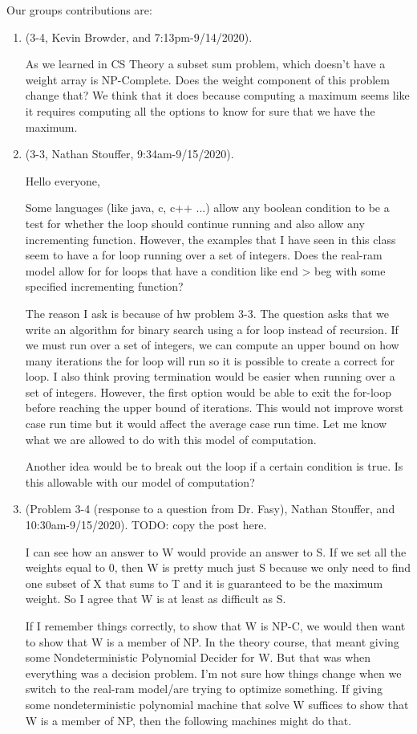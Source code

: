 \documentclass{article}
\begin{document}
Our groups contributions are:
\begin{enumerate}
    \item (3-4, Kevin Browder, and 7:13pm-9/14/2020).

    As we learned in CS Theory a subset sum problem, which doesn't have a weight array is NP-Complete. Does the weight component of this problem change that? We think that it does because computing a maximum seems like it requires computing all the options to know for sure that we have the maximum.
    \item (3-3, Nathan Stouffer, 9:34am-9/15/2020).

    Hello everyone,

    Some languages (like java, c, c++ ...) allow any boolean condition to be a test for whether the loop should continue running and also allow any incrementing function. However, the examples that I have seen in this class seem to have a for loop running over a set of integers. Does the real-ram model allow for for loops that have a condition like end > beg with some specified incrementing function?

    The reason I ask is because of hw problem 3-3. The question asks that we write an algorithm for binary search using a for loop instead of recursion. If we must run over a set of integers, we can compute an upper bound on how many iterations the for loop will run so it is possible to create a correct for loop. I also think proving termination would be easier when running over a set of integers. However, the first option would be able to exit the for-loop before reaching the upper bound of iterations. This would not improve worst case run time but it would affect the average case run time. Let me know what we are allowed to do with this model of computation.

    Another idea would be to break out the loop if a certain condition is true. Is this allowable with our model of computation?

    \item (Problem 3-4 (response to a question from Dr. Fasy), Nathan Stouffer, and 10:30am-9/15/2020). TODO:
        copy the post here.

        I can see how an answer to W would provide an answer to S. If we set all the weights equal to 0, then W is pretty much just S because we only need to find one subset of X that sums to T and it is guaranteed to be the maximum weight. So I agree that W is at least as difficult as S.

        If I remember things correctly, to show that W is NP-C, we would then want to show that W is a member of NP. In the theory course, that meant giving some Nondeterministic Polynomial Decider for W. But that was when everything was a decision problem. I'm not sure how things change when we switch to the real-ram model/are trying to optimize something. If giving some nondeterministic polynomial machine that solve W suffices to show that W is a member of NP, then the following machines might do that. \\


\end{enumerate}
\end{document}
